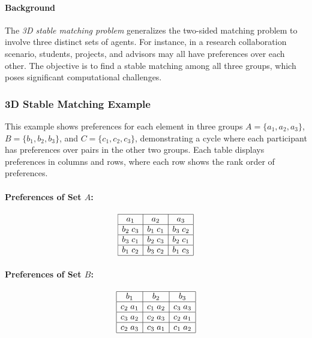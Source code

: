 \paragraph{Background}
The \emph{3D stable matching problem} generalizes the two-sided matching problem to involve three distinct sets of agents. For instance, in a research collaboration scenario, students, projects, and advisors may all have preferences over each other. The objective is to find a stable matching among all three groups, which poses significant computational challenges. \cite{survey} \cite{3dstable}

\subsubsection*{3D Stable Matching Example}

This example shows preferences for each element in three groups \( A = \{a_1, a_2, a_3\} \), \( B = \{b_1, b_2, b_3\} \), and \( C = \{c_1, c_2, c_3\} \), demonstrating a cycle where each participant has preferences over pairs in the other two groups. Each table displays preferences in columns and rows, where each row shows the rank order of preferences.

\paragraph{Preferences of Set \( A \):}
\[
\begin{array}{|c|c|c|}
\hline
a_1 & a_2 & a_3 \\ \hline
b_2 \; c_3 & b_1 \; c_1 & b_3 \; c_2 \\ \hline
b_3 \; c_1 & b_2 \; c_3 & b_2 \; c_1 \\ \hline
b_1 \; c_2 & b_3 \; c_2 & b_1 \; c_3 \\ \hline
\end{array}
\]

\paragraph{Preferences of Set \( B \):}
\[
\begin{array}{|c|c|c|}
\hline
b_1 & b_2 & b_3 \\ \hline
c_2 \; a_1 & c_1 \; a_2 & c_3 \; a_3 \\ \hline
c_3 \; a_2 & c_2 \; a_3 & c_2 \; a_1 \\ \hline
c_2 \; a_3 & c_3 \; a_1 & c_1 \; a_2 \\ \hline
\end{array}
\]

